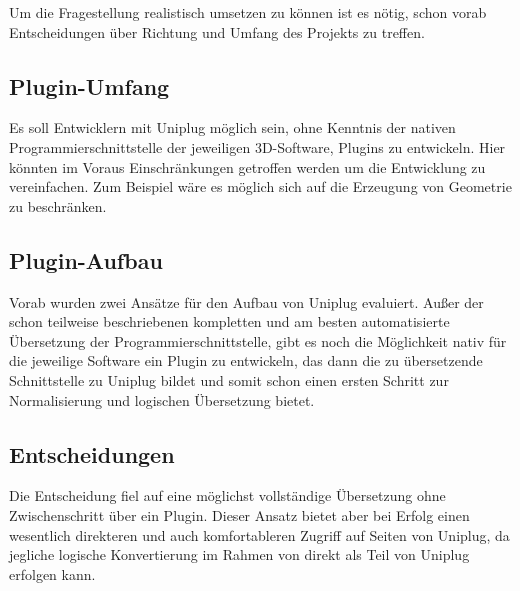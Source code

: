  \label{sec:Vorueberlegungen}

Um die Fragestellung realistisch umsetzen zu können ist es nötig, schon vorab Entscheidungen über Richtung und Umfang des Projekts zu treffen.

\subsection{Plugin-Umfang}
Es soll Entwicklern mit Uniplug möglich sein, ohne Kenntnis der nativen Programmierschnittstelle der jeweiligen 3D-Software, Plugins zu entwickeln. Hier könnten im Voraus Einschränkungen getroffen werden um die Entwicklung zu vereinfachen. Zum Beispiel wäre es möglich sich auf die Erzeugung von Geometrie zu beschränken.

\subsection{Plugin-Aufbau}
Vorab wurden zwei Ansätze für den Aufbau von Uniplug evaluiert. Außer der schon teilweise beschriebenen kompletten und am besten automatisierte Übersetzung der Programmierschnittstelle, gibt es noch die Möglichkeit nativ für die jeweilige Software ein Plugin zu entwickeln, das dann die zu übersetzende Schnittstelle zu Uniplug bildet und somit schon einen ersten Schritt zur Normalisierung und logischen Übersetzung bietet.

\subsection{Entscheidungen}
Die Entscheidung fiel auf eine möglichst vollständige Übersetzung ohne Zwischenschritt über ein Plugin. Dieser Ansatz bietet aber bei Erfolg einen wesentlich direkteren und auch komfortableren Zugriff auf Seiten von Uniplug, da jegliche logische Konvertierung im Rahmen von \CS direkt als Teil von Uniplug erfolgen kann.

